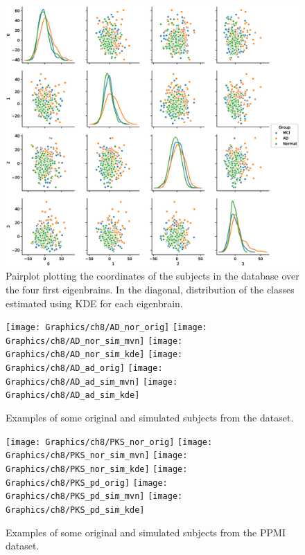 \begin{figure}[h]
	\centering
	\includegraphics[width=\linewidth]{Graphics/ch8/Pairplot}
	\caption{Pairplot plotting the coordinates of the subjects in the \adnipet{} database over the four first eigenbrains. In the diagonal, distribution of the classes estimated using \acs{KDE} for each eigenbrain.}
	\label{fig:pairplot}
\end{figure}

\begin{figure}[h]
	\centering
	\texttt{[image: Graphics/ch8/AD\_nor\_orig]}
	\texttt{[image: Graphics/ch8/AD\_nor\_sim\_mvn]}
	\texttt{[image: Graphics/ch8/AD\_nor\_sim\_kde]}
	\texttt{[image: Graphics/ch8/AD\_ad\_orig]}
	\texttt{[image: Graphics/ch8/AD\_ad\_sim\_mvn]}
	\texttt{[image: Graphics/ch8/AD\_ad\_sim\_kde]}
	\caption{Examples of some original and simulated subjects from the \adnipet{} dataset.}
	\label{fig:samplesPET}
\end{figure}

\begin{figure}[h]
	\centering
	\texttt{[image: Graphics/ch8/PKS\_nor\_orig]}
	\texttt{[image: Graphics/ch8/PKS\_nor\_sim\_mvn]}
	\texttt{[image: Graphics/ch8/PKS\_nor\_sim\_kde]}
	\texttt{[image: Graphics/ch8/PKS\_pd\_orig]}
	\texttt{[image: Graphics/ch8/PKS\_pd\_sim\_mvn]}
	\texttt{[image: Graphics/ch8/PKS\_pd\_sim\_kde]}
	\caption{Examples of some original and simulated subjects from the PPMI dataset.}
	\label{fig:samplesDAT}
\end{figure}

